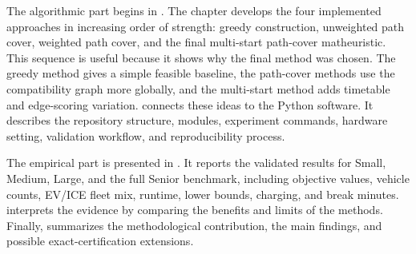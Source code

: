 The algorithmic part begins in .  The chapter develops
the four implemented approaches in increasing order of strength: greedy
construction, unweighted path cover, weighted path cover, and the final
multi-start path-cover matheuristic.  This sequence is useful because it shows
why the final method was chosen.  The greedy method gives a simple feasible
baseline, the path-cover methods use the compatibility graph more globally,
and the multi-start method adds timetable and edge-scoring variation.
 connects these ideas to the Python software.  It
describes the repository structure, modules, experiment commands, hardware
setting, validation workflow, and reproducibility process.

The empirical part is presented in .  It reports the
validated results for Small, Medium, Large, and the full Senior benchmark,
including objective values, vehicle counts, EV/ICE fleet mix, runtime, lower
bounds, charging, and break minutes.   interprets the
evidence by comparing the benefits and limits of the methods.  Finally,
 summarizes the methodological contribution, the main
findings, and possible exact-certification extensions.
